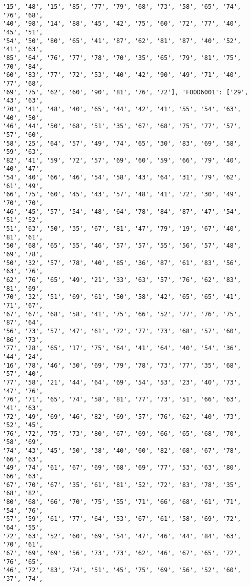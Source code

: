 \documentclass[11pt]{article}
\begin{document}
\begin{Verbatim}[commandchars=\\\{\}]
'15', '48', '15', '85', '77', '79', '68', '73', '58', '65', '74', '76', '68',
'40', '98', '14', '88', '45', '42', '75', '60', '72', '77', '40', '45', '51',
'54', '50', '80', '65', '41', '87', '62', '81', '87', '40', '52', '41', '63',
'85', '64', '76', '77', '78', '70', '35', '65', '79', '81', '75', '70', '84',
'60', '83', '77', '72', '53', '40', '42', '90', '49', '71', '40', '77', '68',
'69', '75', '62', '60', '90', '81', '76', '72'], 'FOOD6001': ['29', '43', '63',
'70', '41', '48', '40', '65', '44', '42', '41', '55', '54', '63', '40', '50',
'46', '44', '50', '68', '51', '35', '67', '68', '75', '77', '57', '57', '60',
'58', '25', '64', '57', '49', '74', '65', '30', '83', '69', '58', '59', '63',
'82', '41', '59', '72', '57', '69', '60', '59', '66', '79', '40', '40', '47',
'54', '40', '66', '46', '54', '58', '43', '64', '31', '79', '62', '61', '49',
'66', '75', '60', '45', '43', '57', '48', '41', '72', '30', '49', '70', '70',
'46', '45', '57', '54', '48', '64', '78', '84', '87', '47', '54', '51', '52',
'51', '63', '50', '35', '67', '81', '47', '79', '19', '67', '40', '81', '61',
'50', '68', '65', '55', '46', '57', '57', '55', '56', '57', '48', '69', '78',
'50', '32', '57', '78', '40', '85', '36', '87', '61', '83', '56', '63', '76',
'62', '76', '65', '49', '21', '33', '63', '57', '76', '62', '83', '81', '69',
'70', '32', '51', '69', '61', '50', '58', '42', '65', '65', '41', '71', '67',
'67', '67', '68', '58', '41', '75', '66', '52', '77', '76', '75', '87', '64',
'56', '73', '57', '47', '61', '72', '77', '73', '68', '57', '60', '86', '73',
'77', '28', '65', '17', '75', '64', '41', '64', '40', '54', '36', '44', '24',
'16', '78', '46', '30', '69', '79', '78', '73', '77', '35', '68', '57', '40',
'77', '58', '21', '44', '64', '69', '54', '53', '23', '40', '73', '47', '76',
'76', '71', '65', '74', '58', '81', '77', '73', '51', '66', '63', '41', '63',
'72', '49', '69', '46', '82', '69', '57', '76', '62', '40', '73', '52', '45',
'76', '72', '75', '73', '80', '67', '69', '66', '65', '68', '70', '58', '69',
'74', '43', '45', '50', '38', '40', '60', '82', '68', '67', '78', '66', '63',
'49', '74', '61', '67', '69', '68', '69', '77', '53', '63', '80', '66', '63',
'67', '70', '67', '35', '61', '81', '52', '72', '83', '78', '35', '68', '82',
'80', '68', '66', '70', '75', '55', '71', '66', '68', '61', '71', '54', '76',
'57', '59', '61', '77', '64', '53', '67', '61', '58', '69', '72', '64', '55',
'72', '63', '52', '60', '69', '54', '47', '46', '44', '84', '63', '70', '61',
'67', '69', '69', '56', '73', '73', '62', '46', '67', '65', '72', '76', '65',
'46', '72', '83', '74', '51', '45', '75', '69', '56', '52', '60', '37', '74',

\end{Verbatim}
\end{document}
